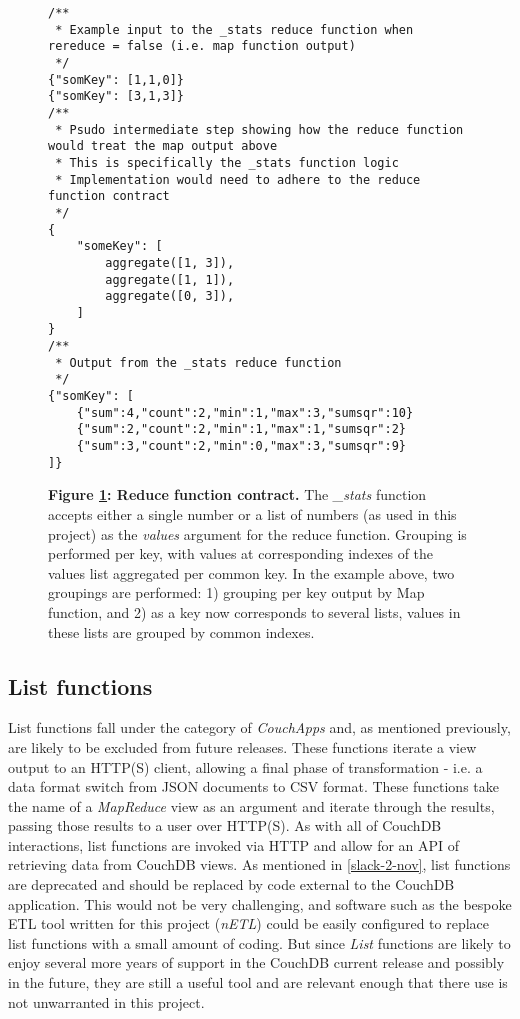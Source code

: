 \begin{figure}[ht]
    \begin{verbatim}
/**
 * Example input to the _stats reduce function when rereduce = false (i.e. map function output)
 */
{"somKey": [1,1,0]}
{"somKey": [3,1,3]}
/**
 * Psudo intermediate step showing how the reduce function would treat the map output above
 * This is specifically the _stats function logic
 * Implementation would need to adhere to the reduce function contract
 */
{
    "someKey": [
        aggregate([1, 3]),
        aggregate([1, 1]),
        aggregate([0, 3]),
    ]
}
/**
 * Output from the _stats reduce function
 */
{"somKey": [
    {"sum":4,"count":2,"min":1,"max":3,"sumsqr":10}
    {"sum":2,"count":2,"min":1,"max":1,"sumsqr":2}
    {"sum":3,"count":2,"min":0,"max":3,"sumsqr":9}
]}
    \end{verbatim}
    \caption[\textit{\_stats} function contract]{\textbf{Figure \ref{stats-reduce-fn}: Reduce function contract.} The \textit{\_stats} function accepts either a single number or a list of numbers (as used in this project) as the \textit{values} argument for the reduce function. Grouping is performed per key, with values at corresponding indexes of the values list aggregated per common key. In the example above, two groupings are performed: 1) grouping per key output by Map function, and 2) as a key now corresponds to several lists, values in these lists are grouped by common indexes.}
    \label{stats-reduce-fn}
\end{figure}



\subsection{List functions}
List functions fall under the category of \textit{CouchApps} and, as mentioned previously, are likely to be excluded from future releases. These functions iterate a view output to an HTTP(S) client, allowing a final phase of transformation - i.e. a data format switch from JSON documents to CSV format. These  functions take the name of a \textit{MapReduce} view as an argument and iterate through the results, passing those results to a user over HTTP(S). As with all of CouchDB interactions, list functions are invoked via HTTP and allow for an API of retrieving data from CouchDB views. As mentioned in \ref{slack-2-nov}, list functions are deprecated and should be replaced by code external to the CouchDB application. This would not be very challenging, and software such as the bespoke ETL tool written for this project (\textit{nETL}) could be easily configured to replace list functions with a small amount of coding. But since \textit{List} functions are likely to enjoy several more years of support in the CouchDB current release and possibly in the future, they are still a useful tool and are relevant enough that there use is not unwarranted in this project.